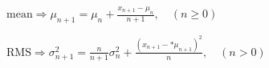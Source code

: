 \documentclass{article}
\begin{document}
$\text{mean}\Rightarrow \mu_{n+1} = \mu_n + \displaystyle\frac{x_{n+1} - \mu_n}{n + 1},\quad(n\geq0)$
\pagebreak

$\text{RMS}\Rightarrow\sigma^2_{n+1} = \displaystyle\frac{n}{n + 1}\sigma^2_n + \displaystyle\frac{(x_{n+1} - *\mu_{n+1})^2}{n},\quad(n>0)$
\pagebreak
\end{document}
